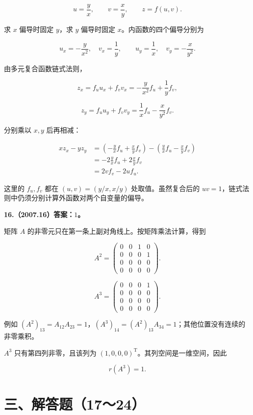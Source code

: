 \documentclass[UTF8,11pt,fontset=windows]{ctexart}
\begin{document}
$$
u=\frac yx,\qquad v=\frac xy,\qquad z=f(u,v).
$$

求 $x$ 偏导时固定 $y$，求 $y$ 偏导时固定 $x$。内函数的四个偏导分别为

$$
u_x=-\frac y{x^2},\quad v_x=\frac1y,
\qquad
u_y=\frac1x,\quad v_y=-\frac x{y^2}.
$$

由多元复合函数链式法则，

$$
z_x=f_u u_x+f_v v_x
=-\frac y{x^2}f_u+\frac1y f_v,
$$

$$
z_y=f_u u_y+f_v v_y
=\frac1x f_u-\frac x{y^2}f_v.
$$

分别乘以 $x,y$ 后再相减：

$$
\begin{aligned}
xz_x-yz_y
&=\left(-\frac yx f_u+\frac xy f_v\right)
 -\left(\frac yx f_u-\frac xy f_v\right)\\
&=-2\frac yx f_u+2\frac xy f_v\\
&=\boxed{2v f_v-2u f_u}.
\end{aligned}
$$

这里的 $f_u,f_v$ 都在 $(u,v)=(y/x,x/y)$ 处取值。虽然复合后的 $uv=1$，链式法则中仍须分别计算外函数对两个自变量的偏导。

\clearpage

\textbf{16.（2007.16）答案：$1$。}

矩阵 $A$ 的非零元只在第一条上副对角线上。按矩阵乘法计算，得到

$$
A^2=\begin{pmatrix}
0&0&1&0\\0&0&0&1\\0&0&0&0\\0&0&0&0
\end{pmatrix}.
$$

$$
A^3=\begin{pmatrix}
0&0&0&1\\0&0&0&0\\0&0&0&0\\0&0&0&0
\end{pmatrix}.
$$

例如 $(A^2)_{13}=A_{12}A_{23}=1$，$(A^3)_{14}=(A^2)_{13}A_{34}=1$；其他位置没有连续的非零乘积。

$A^3$ 只有第四列非零，且该列为 $(1,0,0,0)^{\mathrm T}$。其列空间是一维空间，因此

$$
\boxed{r(A^3)=1.}
$$

\clearpage

\section*{三、解答题（17～24）}
\end{document}
